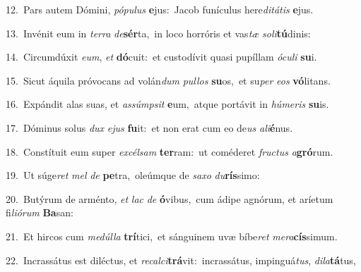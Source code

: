 {\numbfont\textcolor{\numbcolor}{12.}}~Pars autem Dómini, \textit{pó}\-\textit{pu}\textit{lus} \textbf{e}\-jus:~\star Jacob funículus here\-\textit{di}\-\textit{tá}\textit{tis} \textbf{e}\-jus.\par
{\numbfont\textcolor{\numbcolor}{13.}}~Invénit eum in \textit{ter}\-\textit{ra} \textit{de}\-\textbf{sér}ta,~\star in loco horróris et vas\textit{tæ} \textit{so}\-\textit{li}\textbf{tú}dinis:\par
{\numbfont\textcolor{\numbcolor}{14.}}~Circumdúxit \textit{e}\-\textit{um}, \textit{et} \textbf{dó}\-cuit:~\star et custodívit quasi pupíllam \textit{ó}\-\textit{cu}\textit{li} \textbf{su}\-i.\par
{\numbfont\textcolor{\numbcolor}{15.}}~Sicut áquila próvocans ad volán\textit{dum} \textit{pul}\-\textit{los} \textbf{su}\-os,~\star et su\textit{per} \textit{e}\-\textit{os} \textbf{vó}\-litans.\par
{\numbfont\textcolor{\numbcolor}{16.}}~Expándit alas suas, et \textit{as}\-\textit{súmp}\textit{sit} \textbf{e}\-um,~\star atque portávit in \textit{hú}\-\textit{me}\textit{ris} \textbf{su}\-is.\par
{\numbfont\textcolor{\numbcolor}{17.}}~Dóminus solus \textit{dux} \textit{e}\-\textit{jus} \textbf{fu}\-it:~\star et non erat cum eo de\textit{us} \textit{a}\-\textit{li}\textbf{é}nus.\par
{\numbfont\textcolor{\numbcolor}{18.}}~Constítuit eum super \textit{ex}\-\textit{cél}\textit{sam} \textbf{ter}\-ram:~\star ut coméderet \textit{fruc}\-\textit{tus} \textit{a}\-\textbf{gró}rum.\par
{\numbfont\textcolor{\numbcolor}{19.}}~Ut súge\textit{ret} \textit{mel} \textit{de} \textbf{pe}\-tra,~\star oleúmque de \textit{sa}\-\textit{xo} \textit{du}\-\textbf{rís}simo:\par
{\numbfont\textcolor{\numbcolor}{20.}}~Butýrum de arménto, \textit{et} \textit{lac} \textit{de} \textbf{ó}\-vibus,~\star cum ádipe agnórum, et aríetum fi\-\textit{li}\-\textit{ó}\textit{rum} \textbf{Ba}\-san:\par
{\numbfont\textcolor{\numbcolor}{21.}}~Et hircos cum \textit{me}\-\textit{dúl}\textit{la} \textbf{trí}\-tici,~\star et sánguinem uvæ bíbe\textit{ret} \textit{me}\-\textit{ra}\textbf{cís}simum.\par
{\numbfont\textcolor{\numbcolor}{22.}}~Incrassátus est diléctus, et \textit{re}\-\textit{cal}\textit{ci}\textbf{trá}vit:~\star incrassátus, impinguá\-\textit{tus}\-, \textit{di}\-\textit{la}\textbf{tá}tus,\par
